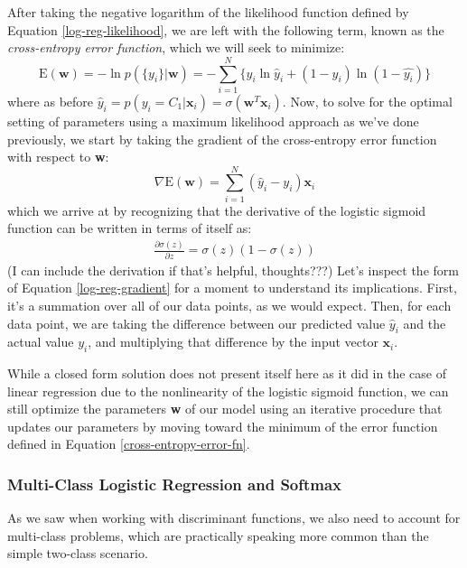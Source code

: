 After taking the negative logarithm of the likelihood function defined by Equation \ref{log-reg-likelihood}, we are left with the following term, known as the \textit{cross-entropy error function}, which we will seek to minimize:
\begin{equation} \label{cross-entropy-error-fn}
	\mathrm{E}(\textbf{w}) = - \ln{p(\{y_{i}\}|\textbf{w})} = - \sum_{i=1}^{N} \{y_{i}\ln{\hat{y}_i} + (1 - y_{i})\ln{(1-\hat{y_{i}})}\}
\end{equation}
where as before $\hat{y}_{i} = p(y_{i}=C_{1}|\textbf{x}_{i}) = \sigma(\textbf{w}^{T}\textbf{x}_{i})$. Now, to solve for the optimal setting of parameters using a maximum likelihood approach as we've done previously, we start by taking the gradient of the cross-entropy error function with respect to \textbf{w}:
\begin{equation} \label{log-reg-gradient}
	\nabla \mathrm{E}(\textbf{w}) = \sum_{i=1}^{N}(\hat{y}_{i} - y_{i})\textbf{x}_{i}
\end{equation}
which we arrive at by recognizing that the derivative of the logistic sigmoid function can be written in terms of itself as:
\begin{align*}
	\frac{\partial \sigma(z)}{\partial z} = \sigma(z)(1 - \sigma(z))
\end{align*}
(I can include the derivation if that's helpful, thoughts???) Let's inspect the form of Equation \ref{log-reg-gradient} for a moment to understand its implications. First, it's a summation over all of our data points, as we would expect. Then, for each data point, we are taking the difference between our predicted value $\hat{y}_{i}$ and the actual value $y_{i}$, and multiplying that difference by the input vector $\textbf{x}_{i}$.

While a closed form solution does not present itself here as it did in the case of linear regression due to the nonlinearity of the logistic sigmoid function, we can still optimize the parameters \textbf{w} of our model using an iterative procedure that updates our parameters by moving toward the minimum of the error function defined in Equation \ref{cross-entropy-error-fn}.

\subsubsection{Multi-Class Logistic Regression and Softmax}
As we saw when working with discriminant functions, we also need to account for multi-class problems, which are practically speaking more common than the simple two-class scenario.


